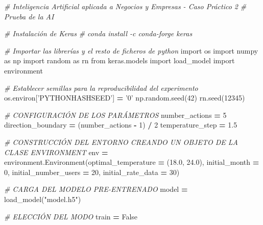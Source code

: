 \documentclass[]{book}
\newenvironment{Shaded}{\begin{snugshade}}{\end{snugshade}}
\newcommand{\CommentTok}[1]{\textcolor[rgb]{0.56,0.35,0.01}{\textit{#1}}}
\newcommand{\DecValTok}[1]{\textcolor[rgb]{0.00,0.00,0.81}{#1}}
\newcommand{\FloatTok}[1]{\textcolor[rgb]{0.00,0.00,0.81}{#1}}
\newcommand{\ImportTok}[1]{#1}
\newcommand{\NormalTok}[1]{#1}
\newcommand{\OperatorTok}[1]{\textcolor[rgb]{0.81,0.36,0.00}{\textbf{#1}}}
\newcommand{\StringTok}[1]{\textcolor[rgb]{0.31,0.60,0.02}{#1}}
\newcommand{\VariableTok}[1]{\textcolor[rgb]{0.00,0.00,0.00}{#1}}
\begin{document}
\begin{Shaded}
\begin{Highlighting}[]
\CommentTok{# Inteligencia Artificial aplicada a Negocios y Empresas - Caso Práctico 2}
\CommentTok{# Prueba de la AI}

\CommentTok{# Instalación de Keras}
\CommentTok{# conda install -c conda-forge keras}

\CommentTok{# Importar las librerías y el resto de ficheros de python}
\ImportTok{import}\NormalTok{ os}
\ImportTok{import}\NormalTok{ numpy }\ImportTok{as}\NormalTok{ np}
\ImportTok{import}\NormalTok{ random }\ImportTok{as}\NormalTok{ rn}
\ImportTok{from}\NormalTok{ keras.models }\ImportTok{import}\NormalTok{ load_model}
\ImportTok{import}\NormalTok{ environment}

\CommentTok{# Establecer semillas para la reproducibilidad del experimento}
\NormalTok{os.environ[}\StringTok{'PYTHONHASHSEED'}\NormalTok{] }\OperatorTok{=} \StringTok{'0'}
\NormalTok{np.random.seed(}\DecValTok{42}\NormalTok{)}
\NormalTok{rn.seed(}\DecValTok{12345}\NormalTok{)}

\CommentTok{# CONFIGURACIÓN DE LOS PARÁMETROS}
\NormalTok{number_actions }\OperatorTok{=} \DecValTok{5}
\NormalTok{direction_boundary }\OperatorTok{=}\NormalTok{ (number_actions }\OperatorTok{-} \DecValTok{1}\NormalTok{) }\OperatorTok{/} \DecValTok{2}
\NormalTok{temperature_step }\OperatorTok{=} \FloatTok{1.5}

\CommentTok{# CONSTRUCCIÓN DEL ENTORNO CREANDO UN OBJETO DE LA CLASE ENVIRONMENT}
\NormalTok{env }\OperatorTok{=}\NormalTok{ environment.Environment(optimal_temperature }\OperatorTok{=}\NormalTok{ (}\FloatTok{18.0}\NormalTok{, }\FloatTok{24.0}\NormalTok{),}
\NormalTok{                              initial_month }\OperatorTok{=} \DecValTok{0}\NormalTok{,}
\NormalTok{                              initial_number_users }\OperatorTok{=} \DecValTok{20}\NormalTok{,}
\NormalTok{                              initial_rate_data }\OperatorTok{=} \DecValTok{30}\NormalTok{)}

\CommentTok{# CARGA DEL MODELO PRE-ENTRENADO}
\NormalTok{model }\OperatorTok{=}\NormalTok{ load_model(}\StringTok{"model.h5"}\NormalTok{)}

\CommentTok{# ELECCIÓN DEL MODO}
\NormalTok{train }\OperatorTok{=} \VariableTok{False}


\end{Highlighting}
\end{Shaded}
\end{document}
